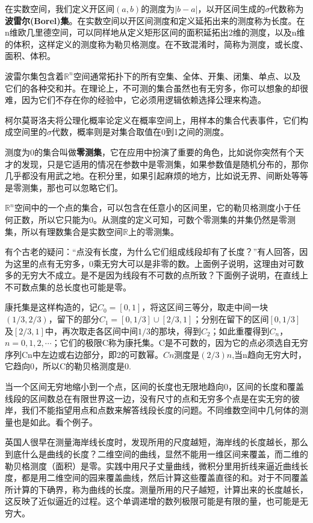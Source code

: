 在实数空间，我们定义开区间$ (a, b) $的测度为$ |b-a| $，以开区间生成的$ \sigma $代数称为\textbf{波雷尔(Borel)集}。在实数空间以开区间测度和定义延拓出来的测度称为长度。在n维欧几里德空间，可以同样地从定义矩形区间的面积延拓出2维的测度，以及n维的体积，这样定义的测度称为勒贝格测度。在不致混淆时，简称为测度，或长度、面积、体积。

波雷尔集包含着$ \mathbb{R}^n $空间通常拓扑下的所有空集、全体、开集、闭集、单点、以及它们的各种交和并。在理论上，不可测的集合虽然也有无穷多，你可以想象的却很难，因为它们不存在你的经验中，它必须用逻辑依赖选择公理来构造。

柯尔莫哥洛夫将公理化概率论定义在概率空间上，用样本的集合代表事件，它们构成空间里的$ \sigma $代数，概率则是对集合取值在0到1之间的测度。

测度为0的集合叫做\textbf{零测集}，它在应用中扮演了重要的角色，比如说你突然有个天才的发现，只是它适用的情况在参数中是零测集，如果参数值是随机分布的，那你几乎都没有用武之地。在积分里，如果引起麻烦的地方，比如说无界、间断处等等是零测集，那也可以忽略它们。

$ \mathbb{R}^n $空间中的一个点的集合，可以包含在任意小的区间里，它的勒贝格测度小于任何正数，所以它只能为0。从测度的定义可知，可数个零测集的并集仍然是零测集，所以有理数集合是实数空间$ \mathbb{R} $上的零测集。

有个古老的疑问：“点没有长度，为什么它们组成线段却有了长度？”有人回答，因为这里的点有无穷多，0乘无穷大可以是非零的数。上面例子说明，这理由对可数多的无穷大不成立。是不是因为线段有不可数的点所致？下面例子说明，在直线上不可数点集的总长度也可能是零。

\kaishu\setlength{\leftskip}{1em}

康托集是这样构造的，记$ C_0=[0,1] $，将这区间三等分，取走中间一块$ (1/3, 2/3) $，留下的部分$ C_1=[0,1/3]\cup[2/3,1] $；分别在留下的区间$ [0,1/3] $及$ [2/3,1] $中，再次取走各区间中间$ 1/3 $的那块，得到$ C_2 $；如此重覆得到$ C_n $，$ n=0,1,2,\cdots $；它们的极限C称为康托集。C是不可数的，因为它的点必须选自无穷序列Cn中左边或右边部分，即2的可数幂。$ Cn $测度是$ (2/3)n $,当n趋向无穷大时，它趋向0，所以C的勒贝格测度是0.

\songti\setlength{\leftskip}{0em}

当一个区间无穷地缩小到一个点，区间的长度也无限地趋向0，区间的长度和覆盖线段的区间数总在有限世界这一边，没有尺寸的点和无穷多个点是在实无穷的彼岸，我们不能指望用点和点数来解答线段长度的问题。不同维数空间中几何体的测量也是如此。看个例子。

\kaishu\setlength{\leftskip}{1em}

英国人很早在测量海岸线长度时，发现所用的尺度越短，海岸线的长度越长，那么到底什么是曲线的长度？二维空间的曲线，显然不能用一维区间来覆盖，而二维的勒贝格测度（面积）是零。实践中用尺子丈量曲线，微积分里用折线来逼近曲线长度，都是用二维空间的园来覆盖曲线，然后计算这些覆盖直径的和。对于不同覆盖所计算的下确界，称为曲线的长度。测量所用的尺子越短，计算出来的长度越长，这反映了近似逼近的过程。这个单调递增的数列极限可能是有限的量，也可能是无穷大。

